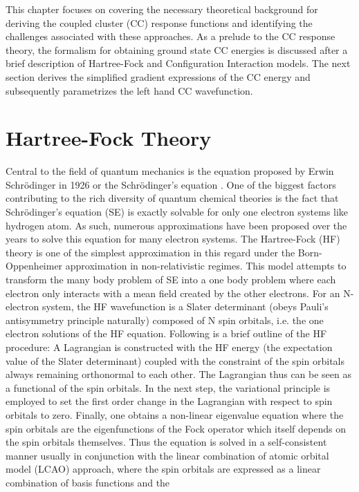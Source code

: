 This chapter focuses on covering the necessary theoretical background 
for deriving the coupled cluster (CC) response functions and identifying
the challenges associated with these approaches.
As a prelude to the CC response theory, the formalism for obtaining ground state CC energies 
is discussed after a brief description of Hartree-Fock and Configuration Interaction models.
The next section derives the simplified gradient expressions of the CC energy and subsequently 
parametrizes the left hand CC wavefunction.
\section{Hartree-Fock Theory}
Central to the field of quantum mechanics is the equation proposed by Erwin Schr\"odinger 
in 1926 or the Schr\"odinger's equation \cite{Schrodinger26}. One of the biggest factors 
contributing to the rich diversity of quantum chemical theories is the fact that Schr\"odinger's equation (SE)
is exactly solvable for only one electron systems like hydrogen atom. As such, numerous approximations
have been proposed over the years to solve this equation for many electron systems.
The Hartree-Fock (HF) theory\cite{} is one of the simplest approximation in this regard
under the Born-Oppenheimer approximation\cite{} in non-relativistic regimes\cite{}. This
model attempts to transform the many body problem of SE into a one body problem where each electron
only interacts with a mean field created by the other electrons. For an N-electron system, the HF 
wavefunction is a Slater determinant (obeys Pauli's antisymmetry principle naturally) composed of N 
spin orbitals, i.e. the one electron solutions of the HF equation. Following is a brief outline
of the HF procedure: A Lagrangian is constructed with the HF energy (the expectation value of the 
Slater determinant) coupled with the constraint of the spin orbitals always remaining 
orthonormal to each other. The Lagrangian thus can be seen as a functional of the spin 
orbitals. In the next step, the variational principle is employed to set the first order 
change in the Lagrangian with respect to spin orbitals to zero. Finally, one obtains 
a non-linear eigenvalue equation where the spin orbitals are the eigenfunctions of 
the Fock operator which itself depends on the spin orbitals themselves. 
Thus the equation is solved in a self-consistent manner usually in conjunction with 
the linear combination of atomic orbital model (LCAO) approach, where the spin 
orbitals are expressed as a linear combination of basis functions and the 
